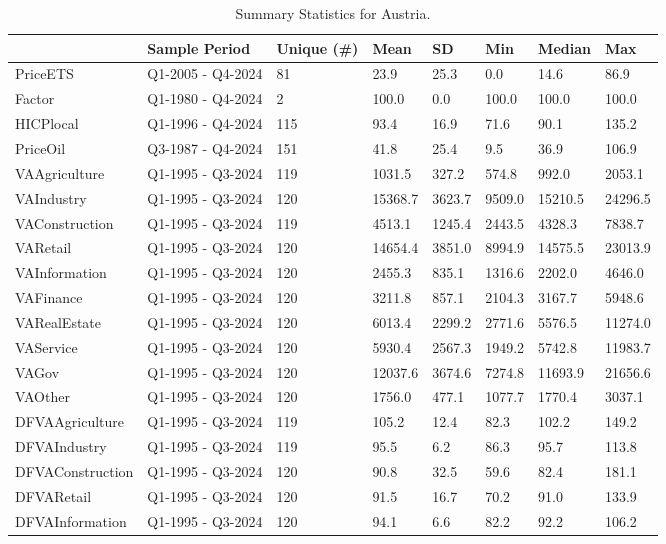 \begingroup\fontsize{7}{9}\selectfont

\begin{longtable}[t]{llllllll}
\caption{Summary Statistics for Austria.}\\
\toprule
  & Sample Period & Unique (\#) & Mean & SD & Min & Median & Max\\
\midrule
PriceETS & Q1-2005 - Q4-2024 & 81 & 23.9 & 25.3 & 0.0 & 14.6 & 86.9\\
Factor & Q1-1980 - Q4-2024 & 2 & 100.0 & 0.0 & 100.0 & 100.0 & 100.0\\
HICPlocal & Q1-1996 - Q4-2024 & 115 & 93.4 & 16.9 & 71.6 & 90.1 & 135.2\\
PriceOil & Q3-1987 - Q4-2024 & 151 & 41.8 & 25.4 & 9.5 & 36.9 & 106.9\\
VAAgriculture & Q1-1995 - Q3-2024 & 119 & 1031.5 & 327.2 & 574.8 & 992.0 & 2053.1\\
\addlinespace
VAIndustry & Q1-1995 - Q3-2024 & 120 & 15368.7 & 3623.7 & 9509.0 & 15210.5 & 24296.5\\
VAConstruction & Q1-1995 - Q3-2024 & 119 & 4513.1 & 1245.4 & 2443.5 & 4328.3 & 7838.7\\
VARetail & Q1-1995 - Q3-2024 & 120 & 14654.4 & 3851.0 & 8994.9 & 14575.5 & 23013.9\\
VAInformation & Q1-1995 - Q3-2024 & 120 & 2455.3 & 835.1 & 1316.6 & 2202.0 & 4646.0\\
VAFinance & Q1-1995 - Q3-2024 & 120 & 3211.8 & 857.1 & 2104.3 & 3167.7 & 5948.6\\
\addlinespace
VARealEstate & Q1-1995 - Q3-2024 & 120 & 6013.4 & 2299.2 & 2771.6 & 5576.5 & 11274.0\\
VAService & Q1-1995 - Q3-2024 & 120 & 5930.4 & 2567.3 & 1949.2 & 5742.8 & 11983.7\\
VAGov & Q1-1995 - Q3-2024 & 120 & 12037.6 & 3674.6 & 7274.8 & 11693.9 & 21656.6\\
VAOther & Q1-1995 - Q3-2024 & 120 & 1756.0 & 477.1 & 1077.7 & 1770.4 & 3037.1\\
DFVAAgriculture & Q1-1995 - Q3-2024 & 119 & 105.2 & 12.4 & 82.3 & 102.2 & 149.2\\
\addlinespace
DFVAIndustry & Q1-1995 - Q3-2024 & 119 & 95.5 & 6.2 & 86.3 & 95.7 & 113.8\\
DFVAConstruction & Q1-1995 - Q3-2024 & 120 & 90.8 & 32.5 & 59.6 & 82.4 & 181.1\\
DFVARetail & Q1-1995 - Q3-2024 & 120 & 91.5 & 16.7 & 70.2 & 91.0 & 133.9\\
DFVAInformation & Q1-1995 - Q3-2024 & 120 & 94.1 & 6.6 & 82.2 & 92.2 & 106.2\\

\end{longtable}
